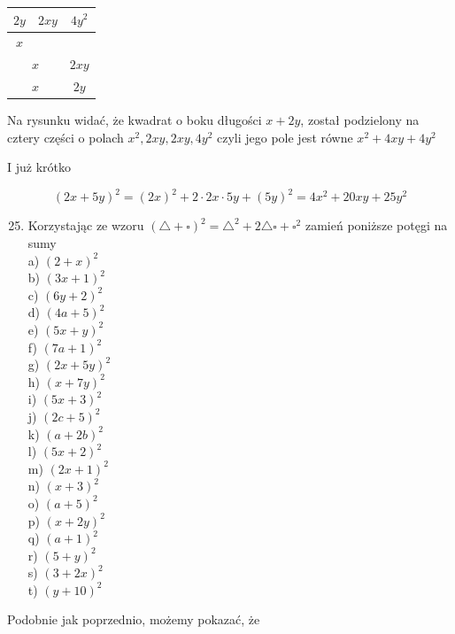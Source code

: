 \documentclass[10pt]{article}
\begin{document}
\begin{center}
\begin{tabular}{c|c|c|}
\hline
\(2 y\) & \(2 x y\) & \(4 y^{2}\) \\
\hline
\(x\) &  &  \\
\hline
\multicolumn{2}{|c|}{\(x\)} & \(2 x y\) \\
\hline
\multicolumn{2}{|c|}{\(x\)} & \(2 y\) \\
\hline
\end{tabular}
\end{center}

Na rysunku widać, że kwadrat o boku długości \(x+2 y\), został podzielony na cztery części o polach \(x^{2}, 2 x y, 2 x y, 4 y^{2}\) czyli jego pole jest równe \(x^{2}+4 x y+4 y^{2}\)

I już krótko

\[
(2 x+5 y)^{2}=(2 x)^{2}+2 \cdot 2 x \cdot 5 y+(5 y)^{2}=4 x^{2}+20 x y+25 y^{2}
\]

\begin{enumerate}
  \setcounter{enumi}{24}
  \item Korzystając ze wzoru \((\triangle+\square)^{2}=\triangle^{2}+2 \triangle \square+\square^{2}\) zamień poniższe potęgi na sumy\\
a) \((2+x)^{2}\)\\
b) \((3 x+1)^{2}\)\\
c) \((6 y+2)^{2}\)\\
d) \((4 a+5)^{2}\)\\
e) \((5 x+y)^{2}\)\\
f) \((7 a+1)^{2}\)\\
g) \((2 x+5 y)^{2}\)\\
h) \((x+7 y)^{2}\)\\
i) \((5 x+3)^{2}\)\\
j) \((2 c+5)^{2}\)\\
k) \((a+2 b)^{2}\)\\
l) \((5 x+2)^{2}\)\\
m) \((2 x+1)^{2}\)\\
n) \((x+3)^{2}\)\\
o) \((a+5)^{2}\)\\
p) \((x+2 y)^{2}\)\\
q) \((a+1)^{2}\)\\
r) \((5+y)^{2}\)\\
s) \((3+2 x)^{2}\)\\
t) \((y+10)^{2}\)
\end{enumerate}

Podobnie jak poprzednio, możemy pokazać, że
\end{document}
